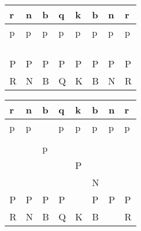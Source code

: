 
\begin{center}\begin{tabular}{|l|l|l|l|l|l|l|l|}
\hline r & n & b & q & k & b & n & r \\
\hline p & p & p & p & p & p & p & p \\
\hline  &  &  &  &  &  &  &  \\
\hline  &  &  &  &  &  &  &  \\
\hline  &  &  &  &  &  &  &  \\
\hline  &  &  &  &  &  &  &  \\
\hline P & P & P & P & P & P & P & P \\
\hline R & N & B & Q & K & B & N & R \\
\hline \end{tabular}\end{center}

\begin{center}\begin{tabular}{|l|l|l|l|l|l|l|l|}
\hline r & n & b & q & k & b & n & r \\
\hline p & p &  & p & p & p & p & p \\
\hline  &  &  &  &  &  &  &  \\
\hline  &  & p &  &  &  &  &  \\
\hline  &  &  &  & P &  &  &  \\
\hline  &  &  &  &  & N &  &  \\
\hline P & P & P & P &  & P & P & P \\
\hline R & N & B & Q & K & B &  & R \\
\hline \end{tabular}\end{center}

